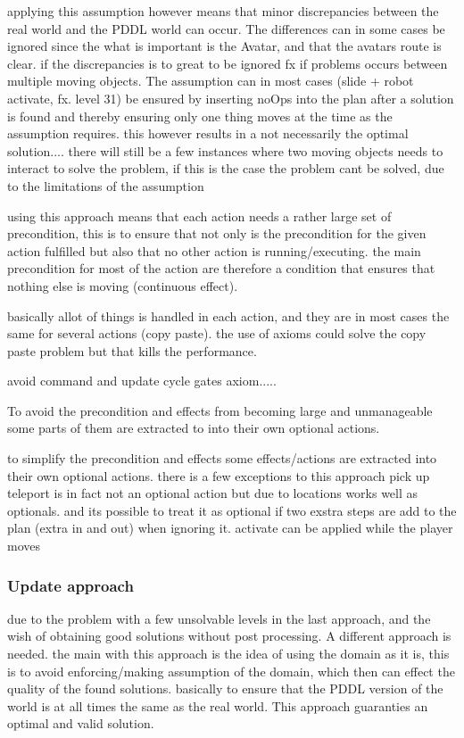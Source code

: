 		applying this assumption however means that minor discrepancies between the real world and the PDDL world can occur. The differences can in some cases be ignored since the what is important is the Avatar, and that the avatars route is clear. 		if the discrepancies is to great to be ignored fx if problems occurs between multiple moving objects. The assumption can in most cases (slide + robot activate, fx. level 31) be ensured by inserting noOps into the plan after a solution is found and thereby ensuring only one thing moves at the time as the assumption requires. this however results in a not necessarily the optimal solution.... there will still be a few instances where two moving objects needs to interact to solve the problem, if this is the case the problem cant be solved, due to the limitations of the assumption
			
		
		
		
		using this approach means that each action needs a rather large set of precondition, this is to ensure that not only is the precondition for the given action fulfilled but also that no other action is running/executing. the main precondition for most of the action are therefore a condition that ensures that nothing else is moving (continuous effect).
		
		basically allot of things is handled in each action, and they are in most cases the same for several actions (copy paste). the use of axioms could solve the copy paste problem but that kills the performance.
		
		avoid command and update cycle
			gates axiom.....
		
		To avoid the precondition and effects from becoming large and unmanageable some parts of them are extracted to into their own optional actions.
		
		to simplify the precondition and effects some effects/actions are extracted into their own optional actions.
		there is a few exceptions to this approach
			pick up
			teleport
				is in fact not an optional action but due to locations works well as optionals. and its possible to treat it as optional if two exstra steps are add to the plan (extra in and out) when ignoring it. 
			activate
				can be applied while the player moves
		
		\subsubsection{Update approach}
		due to the problem with a few unsolvable levels in the last approach, and the wish of obtaining good solutions without post processing. A different approach is needed.
		the main with this approach is the idea of using the domain as it is, this is to avoid enforcing/making assumption of the domain, which then can effect the quality of the found solutions. basically to ensure that the PDDL version of the world is at all times the same as the real world. This approach guaranties an optimal and valid solution.
		
